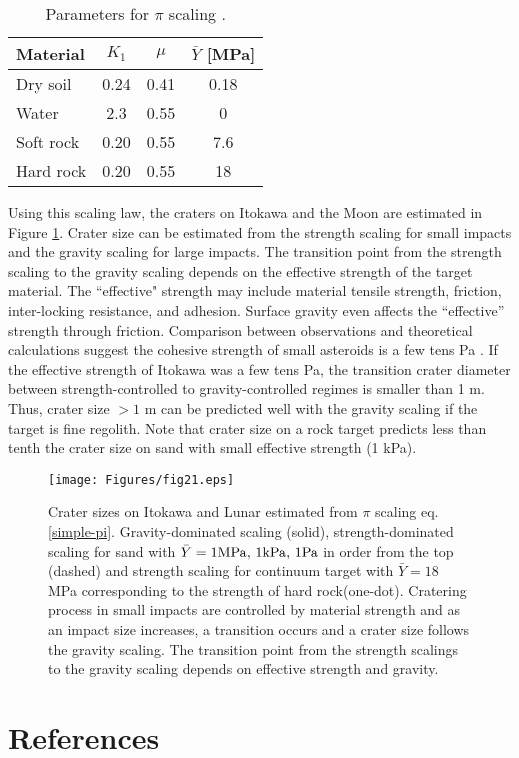 \documentclass[3p,authoryear]{elsarticle}
\begin{document}
\begin{table}[htbp]
	\centering
	\caption{Parameters for $\pi$ scaling \citep{holsapple1993}.}
	\label{pi-params}
	\small
	\begin{tabular}{lccc}\hline
	Material & $K_1$ & $\mu$ & $\bar{Y}$ [MPa]\\ \hline
	Dry soil & 0.24 & 0.41 & 0.18 \\
	Water & 2.3 & 0.55 & 0 \\
	Soft rock & 0.20 & 0.55 & 7.6\\
	Hard rock & 0.20 & 0.55 & 18\\ \hline
	\end{tabular}
	\centering
\end{table}

Using this scaling law, the craters on Itokawa and the Moon are estimated in Figure \ref{impactor-crater}.
Crater size can be estimated from the strength scaling for small impacts and the gravity scaling for large impacts.
The transition point from the strength scaling to the gravity scaling depends on the effective strength of the target material.
The ``effective" strength may include material tensile strength, friction, inter-locking resistance, and adhesion. Surface gravity even affects the ``effective'' strength through friction.
Comparison between observations and theoretical calculations suggest the cohesive strength of small asteroids is a few tens Pa \citep{sanchez2014, rozitis2014}.
If the effective strength of Itokawa was a few tens Pa, the transition crater diameter between strength-controlled to gravity-controlled regimes is smaller than 1 m.
Thus, crater size $> 1$ m can be predicted well with the gravity scaling if the target is fine regolith.
Note that crater size on a rock target predicts less than tenth the crater size on sand with small effective strength (1 kPa).
\begin{figure}[htbp]
	\centering
	\texttt{[image: Figures/fig21.eps]}
	\caption{Crater sizes on Itokawa and Lunar estimated from $\pi$ scaling eq. \eqref{simple-pi}. Gravity-dominated scaling (solid), strength-dominated scaling for sand with $\bar{Y}=1 {\rm MPa},\, 1{\rm kPa},\, 1{\rm Pa}$ in order from the top (dashed) and strength scaling for continuum target with $\bar{Y}=18$ MPa corresponding to the strength of hard rock(one-dot). Cratering process in small impacts are controlled by material strength and as an impact size increases, a transition occurs and a crater size follows the gravity scaling. The transition point from the strength scalings to the gravity scaling depends on effective strength and gravity.}
	\label{impactor-crater}
	\centering
\end{figure}

\section*{References}

\end{document}
